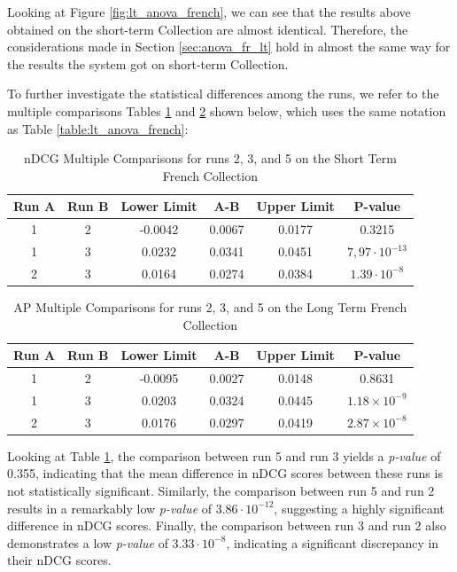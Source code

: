 Looking at Figure \ref{fig:lt_anova_french}, we can see that the results above obtained on the short-term Collection are almost identical.
Therefore, the considerations made in Section \ref{sec:anova_fr_lt} hold in almost the same way for the results the system got on short-term Collection.

To further investigate the statistical differences among the runs, we refer to the multiple comparisons Tables \ref{table:st_anova_french} and \ref{table:st_anova_french_ap} shown below, which uses the same notation as Table \ref{table:lt_anova_french}:

\begin{table}[!h]
    \centering
    \caption{\ac{nDCG} Multiple Comparisons for runs 2, 3, and 5 on the Short Term French Collection}
    \label{table:st_anova_french}
    \begin{tabular}{cccccc}
    \hline
    Run A & Run B & Lower Limit & A-B & Upper Limit & P-value \\ \hline
    1 & 2 & -0.0042 & 0.0067 & 0.0177 & 0.3215 \\
    1 & 3 & 0.0232 & 0.0341 & 0.0451 & $7,97 \cdot 10^{-13}$ \\
    2 & 3 & 0.0164 & 0.0274 & 0.0384 & $1.39 \cdot 10^{-8}$ \\ \hline
    \end{tabular}
\end{table}

\begin{table}[!h]
    \centering
    \caption{\ac{AP} Multiple Comparisons for runs 2, 3, and 5 on the Long Term French Collection}
    \label{table:st_anova_french_ap}
    \begin{tabular}{cccccc}
    \hline
    Run A & Run B & Lower Limit & A-B & Upper Limit & P-value \\ \hline
    1 & 2 & -0.0095 & 0.0027 & 0.0148 & 0.8631 \\
    1 & 3 & 0.0203 & 0.0324 & 0.0445 & $1.18 \times 10^{-9}$ \\
    2 & 3 & 0.0176 & 0.0297 & 0.0419 & $2.87 \times 10^{-8}$ \\ \hline
    \end{tabular}
\end{table}

Looking at Table \ref{table:st_anova_french}, the comparison between run 5 and run 3 yields a \textit{p-value} of 0.355, indicating that the mean difference in \ac{nDCG} scores between these runs is not statistically significant.
Similarly, the comparison between run 5 and run 2 results in a remarkably low \textit{p-value} of $3.86 \cdot 10^{-12}$, suggesting a highly significant difference in \ac{nDCG} scores.
Finally, the comparison between run 3 and run 2 also demonstrates a low \textit{p-value} of $3.33 \cdot 10^{-8}$, indicating a significant discrepancy in their \ac{nDCG} scores.

